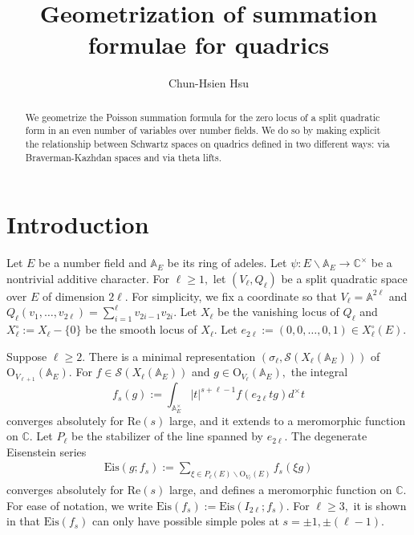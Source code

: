 \documentclass[11pt,a4paper,reqno]{amsart}
\theoremstyle{remark}
\numberwithin{equation}{section}
\newcommand{\A}{\mathbb{A}}
\newcommand{\CC}{\mathbb{C}}
\theoremstyle{definition}
\numberwithin{equation}{section}
\begin{document}
\title{Geometrization of summation formulae for quadrics}

\author{Chun-Hsien Hsu}
\address{Department of Mathematics\\
University of Chicago\\
Chicago, IL 60637}



\begin{abstract}
We geometrize the Poisson summation formula for the zero locus of a split quadratic form in an even number of variables over number fields. We do so by making explicit the relationship between Schwartz spaces on quadrics defined in two different ways: via Braverman-Kazhdan spaces and via theta lifts.
\end{abstract}

\maketitle

\tableofcontents


\section{Introduction}

Let $E$ be a number field and $\mathbb{A}_E$ be its ring of adeles. Let $\psi:E\backslash \A_E\to \CC^\times$ be a nontrivial additive character. For $\ell\ge 1,$ let $(V_\ell,Q_\ell)$ be a split quadratic space over $E$ of dimension $2\ell$. For simplicity, we fix a coordinate so that $V_\ell=\A^{2\ell}$ and $Q_\ell(v_1,\ldots,v_{2\ell})=\sum_{i=1}^{\ell} v_{2i-1}v_{2i}.$ Let $X_\ell$ be the vanishing locus of $Q_\ell$ and $X_\ell^{\circ}:=X_\ell-\{0\}$ be the smooth locus of $X_\ell$. Let $e_{2\ell}:=(0,0,\ldots,0,1)\in X_\ell^\circ(E).$

Suppose $\ell\ge 2$. There is a  minimal representation $(\sigma_\ell,\mathcal{S}(X_\ell(\A_E)))$ of $\mathrm{O}_{V_{\ell+1}}(\mathbb{A}_E).$  For $f\in \mathcal{S}(X_\ell(\A_E))$ and $g\in \mathrm{O}_{V_\ell}(\A_E),$ the integral 
$$f_{s}(g):=\int_{\A_E^\times} |t|^{s+\ell-1} f(e_{2\ell}tg)d^\times t$$  
converges absolutely for $\mathrm{Re}(s)$ large, and it extends to a meromorphic function on $\CC$. Let $P_\ell$ be the stabilizer of the line spanned by $e_{2\ell}$. The degenerate Eisenstein series
\begin{align*}
    \mathrm{Eis}(g;f_{s}):=\sum_{\xi \in P_\ell(E)\backslash \mathrm{O}_{V_\ell}(E)} f_{s}(\xi g)
\end{align*}
converges absolutely for $\mathrm{Re}(s)$ large, and defines a meromorphic function on $\CC$. For ease of notation, we write $\mathrm{Eis}(f_{s}):=\mathrm{Eis}(I_{2\ell};f_{s}).$  For $\ell\ge 3,$ it is shown in \cite{Hsu:asymptotics, Getz:Quad} that $\mathrm{Eis}(f_{s})$ can only have possible simple poles at $s=\pm1, \pm (\ell-1).$
\end{document}
